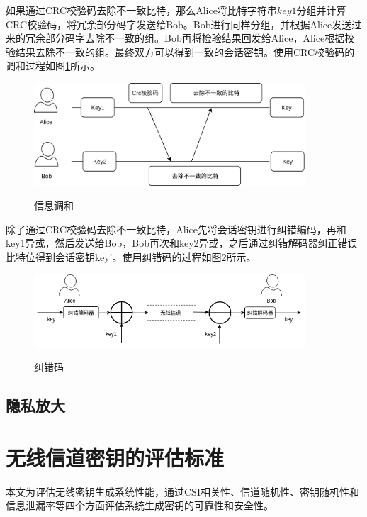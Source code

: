 \documentclass[master]{seuthesis} %
\begin{document}
\begin{Main}
如果通过CRC校验码去除不一致比特，那么Alice将比特字符串$key1$分组并计算CRC校验码，将冗余部分码字发送给Bob。Bob进行同样分组，并根据Alice发送过来的冗余部分码字去除不一致的组。Bob再将检验结果回发给Alice，Alice根据校验结果去除不一致的组。最终双方可以得到一致的会话密钥。使用CRC校验码的调和过程如图\ref{crc}所示。

\begin{figure}
    \centering
    \includegraphics[width=0.9\textwidth]{images/crc}
    \caption{信息调和}{} %
    \label{crc}
\end{figure}

除了通过CRC校验码去除不一致比特，Alice先将会话密钥进行纠错编码，再和key1异或，然后发送给Bob，Bob再次和key2异或，之后通过纠错解码器纠正错误比特位得到会话密钥key'。使用纠错码的过程如图\ref{error_correcting_code}所示。

\begin{figure}
    \centering
    \includegraphics[width=0.9\textwidth]{images/error_correcting_code}
    \caption{纠错码}{} %
    \label{error_correcting_code}
\end{figure}

\subsection{隐私放大}

\section{无线信道密钥的评估标准}

本文为评估无线密钥生成系统性能，通过CSI相关性、信道随机性、密钥随机性和信息泄漏率等四个方面评估系统生成密钥的可靠性和安全性。


\end{Main}
\end{document}
